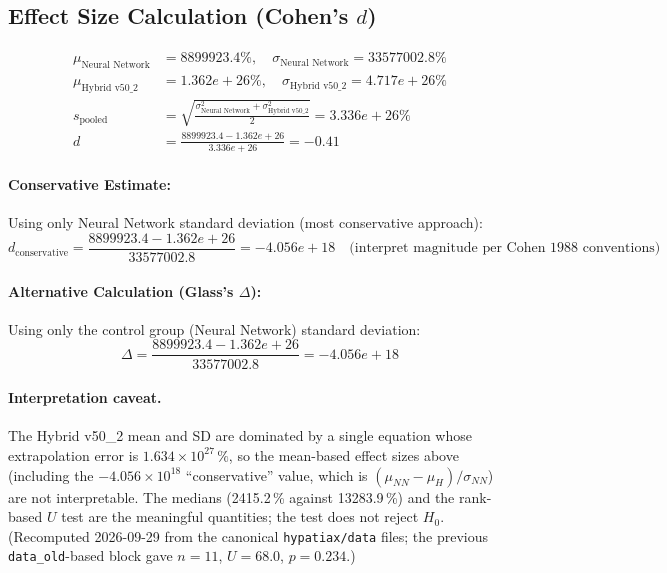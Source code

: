 \documentclass[twoside,11pt]{article}
\begin{document}
\subsection{Effect Size Calculation (Cohen's $d$)}

\begin{align}
\mu_{\text{Neural Network}} &= 8899923.4\%, \quad \sigma_{\text{Neural Network}} = 33577002.8\% \\
\mu_{\text{Hybrid v50\_2}} &= 1.362e+26\%, \quad \sigma_{\text{Hybrid v50\_2}} = 4.717e+26\% \\
s_{\text{pooled}} &= \sqrt{\frac{\sigma_{\text{Neural Network}}^2 + \sigma_{\text{Hybrid v50\_2}}^2}{2}} = 3.336e+26\% \\
d &= \frac{8899923.4 - 1.362e+26}{3.336e+26} = -0.41
\end{align}

\paragraph{Conservative Estimate:}
Using only Neural Network standard deviation (most conservative approach):
\begin{equation}
d_{\text{conservative}} = \frac{8899923.4 - 1.362e+26}{33577002.8} = -4.056e+18 \quad \text{(interpret magnitude per Cohen 1988 conventions)}
\end{equation}

\paragraph{Alternative Calculation (Glass's $\Delta$):}
Using only the control group (Neural Network) standard deviation:
\begin{equation}
\Delta = \frac{8899923.4 - 1.362e+26}{33577002.8} = -4.056e+18
\end{equation}

\paragraph{Interpretation caveat.} The Hybrid v50\_2 mean and SD are dominated by a single equation whose
extrapolation error is $1.634\times10^{27}\,\%$, so the mean-based effect sizes above (including the
$-4.056\times10^{18}$ ``conservative'' value, which is $(\mu_{NN}-\mu_{H})/\sigma_{NN}$) are not interpretable.
The medians (2415.2\,\% against 13283.9\,\%) and the rank-based $U$ test are the meaningful quantities;
the test does not reject $H_0$. (Recomputed 2026-09-29 from the canonical \texttt{hypatiax/data} files; the previous
\texttt{data\_old}-based block gave $n=11$, $U=68.0$, $p=0.234$.)
\end{document}
